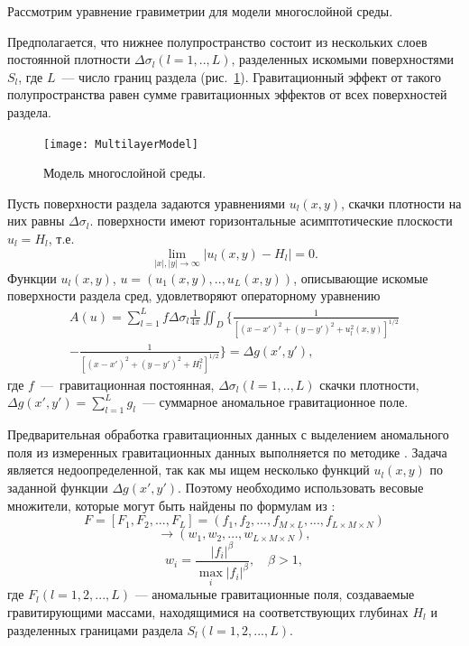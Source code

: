 Рассмотрим уравнение гравиметрии для модели многослойной среды. 

Предполагается, что нижнее полупространство состоит из нескольких слоев постоянной плотности $\Delta\sigma_l(l=1,..,L)$, разделенных искомыми поверхностями $S_l$, где $L$~--- число границ раздела (рис.~\ref{fig:multlayer}). Гравитационный эффект от такого полупространства равен сумме гравитационных эффектов от всех поверхностей раздела.
\begin{figure}
	\centering
	\texttt{[image: MultilayerModel]}
	\caption{Модель многослойной среды.}
	\label{fig:multlayer}
\end{figure}
Пусть поверхности раздела задаются уравнениями $u_l(x,y)$, скачки плотности на них равны $\Delta\sigma_l$. поверхности имеют горизонтальные асимптотические плоскости $u_l=H_l$, т.е. $$\lim_{|x|,|y|\to\infty}|u_l(x,y)-H_l|=0.$$ Функции $u_l(x,y)$, $u=(u_1(x,y), .., u_L(x,y))$, описывающие искомые поверхности раздела сред, удовлетворяют операторному уравнению
\begin{equation}\label{equ_grav}
\begin{aligned}
A(u)=\sum_{l=1}^{L}f\Delta\sigma_l\frac{1}{4\pi}\iint_D\bigg\{\frac{1}{[(x-x')^2+(y-y')^2+u_l^2(x,y)]^{1/2}} \\
-\frac{1}{[(x-x')^2+(y-y')^2+H_l^2]^{1/2}}\bigg\}=\Delta g(x',y'),
\end{aligned}
\end{equation}
где $f$~---~гравитационная постоянная, $\Delta\sigma_l(l=1,..,L)$ скачки плотности, $\Delta g(x',y')=\sum_{l=1}^{L}g_l$~--- суммарное аномальное гравитационное поле. 

Предварительная обработка гравитационных данных с выделением аномального поля из измеренных гравитационных данных выполняется по методике  \cite{MarPrut2003}. Задача является недоопределенной, так как мы ищем несколько функций $u_l(x,y)$ по заданной функции $\Delta g(x',y')$. Поэтому необходимо использовать весовые множители, которые могут быть найдены по формулам из \cite{AkMarMis2013}:
$$F=[F_1, F_2, ..., F_L]=(f_1, f_2, ..., f_{M\times L}, ..., f_{L\times M\times N})$$
$$\to (w_1, w_2, ..., w_{L\times M\times N}),$$
\begin{equation}\label{weght_fact_formula}
w_i=\frac{|f_i|^\beta}{\max\limits_{i} |f_i|^\beta}, \quad \beta>1,
\end{equation}
где $F_l (l=1, 2, ..., L)$ --- аномальные гравитационные поля, создаваемые гравитирующими массами, находящимися на соответствующих глубинах $H_l$ и разделенных границами раздела $S_l(l=1, 2, ..., L)$.

